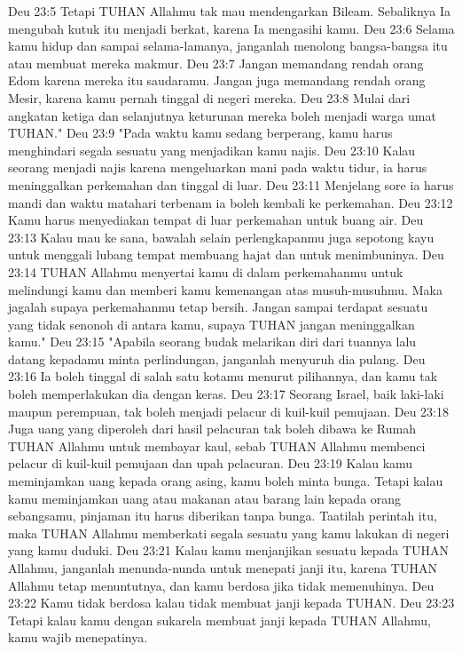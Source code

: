 Deu 23:5  Tetapi TUHAN Allahmu tak mau mendengarkan Bileam. Sebaliknya Ia mengubah kutuk itu menjadi berkat, karena Ia mengasihi kamu.
Deu 23:6  Selama kamu hidup dan sampai selama-lamanya, janganlah menolong bangsa-bangsa itu atau membuat mereka makmur.
Deu 23:7  Jangan memandang rendah orang Edom karena mereka itu saudaramu. Jangan juga memandang rendah orang Mesir, karena kamu pernah tinggal di negeri mereka.
Deu 23:8  Mulai dari angkatan ketiga dan selanjutnya keturunan mereka boleh menjadi warga umat TUHAN."
Deu 23:9  "Pada waktu kamu sedang berperang, kamu harus menghindari segala sesuatu yang menjadikan kamu najis.
Deu 23:10  Kalau seorang menjadi najis karena mengeluarkan mani pada waktu tidur, ia harus meninggalkan perkemahan dan tinggal di luar.
Deu 23:11  Menjelang sore ia harus mandi dan waktu matahari terbenam ia boleh kembali ke perkemahan.
Deu 23:12  Kamu harus menyediakan tempat di luar perkemahan untuk buang air.
Deu 23:13  Kalau mau ke sana, bawalah selain perlengkapanmu juga sepotong kayu untuk menggali lubang tempat membuang hajat dan untuk menimbuninya.
Deu 23:14  TUHAN Allahmu menyertai kamu di dalam perkemahanmu untuk melindungi kamu dan memberi kamu kemenangan atas musuh-musuhmu. Maka jagalah supaya perkemahanmu tetap bersih. Jangan sampai terdapat sesuatu yang tidak senonoh di antara kamu, supaya TUHAN jangan meninggalkan kamu."
Deu 23:15  "Apabila seorang budak melarikan diri dari tuannya lalu datang kepadamu minta perlindungan, janganlah menyuruh dia pulang.
Deu 23:16  Ia boleh tinggal di salah satu kotamu menurut pilihannya, dan kamu tak boleh memperlakukan dia dengan keras.
Deu 23:17  Seorang Israel, baik laki-laki maupun perempuan, tak boleh menjadi pelacur di kuil-kuil pemujaan.
Deu 23:18  Juga uang yang diperoleh dari hasil pelacuran tak boleh dibawa ke Rumah TUHAN Allahmu untuk membayar kaul, sebab TUHAN Allahmu membenci pelacur di kuil-kuil pemujaan dan upah pelacuran.
Deu 23:19  Kalau kamu meminjamkan uang kepada orang asing, kamu boleh minta bunga. Tetapi kalau kamu meminjamkan uang atau makanan atau barang lain kepada orang sebangsamu, pinjaman itu harus diberikan tanpa bunga. Taatilah perintah itu, maka TUHAN Allahmu memberkati segala sesuatu yang kamu lakukan di negeri yang kamu duduki.
Deu 23:21  Kalau kamu menjanjikan sesuatu kepada TUHAN Allahmu, janganlah menunda-nunda untuk menepati janji itu, karena TUHAN Allahmu tetap menuntutnya, dan kamu berdosa jika tidak memenuhinya.
Deu 23:22  Kamu tidak berdosa kalau tidak membuat janji kepada TUHAN.
Deu 23:23  Tetapi kalau kamu dengan sukarela membuat janji kepada TUHAN Allahmu, kamu wajib menepatinya.
